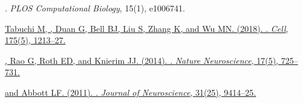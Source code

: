 \begin{description}
{    . \emph{PLOS Computational Biology}, 15(1), e1006741.
    }
  \item \href{https://www.cell.com/cell/fulltext/S0092-8674(18)31228-5}
    {Tabuchi M, , Duan G, Bell BJ, Liu S, Zhang K, and
      Wu MN. (2018). . \emph{Cell}, 175(5), 1213--27.
    }
  \item \href{https://dx.doi.org/10.1038/nn.3687}
    {, Rao G, Roth ED, and Knierim JJ. (2014).
    . \emph{Nature Neuroscience}, 17(5), 725--731.
    }
  \item \href{https://dx.doi.org/10.1523/JNEUROSCI.1433-11.2011}
    { and Abbott LF. (2011). . \emph{Journal of Neuroscience}, 31(25), 9414--25.
    }

\end{description}
